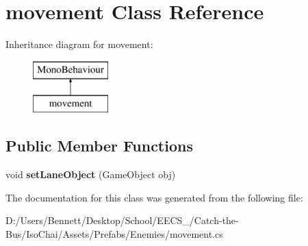 \hypertarget{classmovement}{}\section{movement Class Reference}
\label{classmovement}
Inheritance diagram for movement\+:\begin{figure}[H]
\begin{center}
\leavevmode
\includegraphics[height=2.000000cm]{classmovement}
\end{center}
\end{figure}
\subsection*{Public Member Functions}
\begin{DoxyCompactItemize}
\item 
\mbox{\label{classmovement_ac0f50bd90bad3cbb2b1092cbaa2153e0}} 
void {\bfseries set\+Lane\+Object} (Game\+Object obj)
\end{DoxyCompactItemize}


The documentation for this class was generated from the following file\+:\begin{DoxyCompactItemize}
\item 
D\+:/\+Users/\+Bennett/\+Desktop/\+School/\+E\+E\+C\+S\+\_/\+Catch-\/the-\/\+Bus/\+Iso\+Chai/\+Assets/\+Prefabs/\+Enemies/movement.\+cs\end{DoxyCompactItemize}
